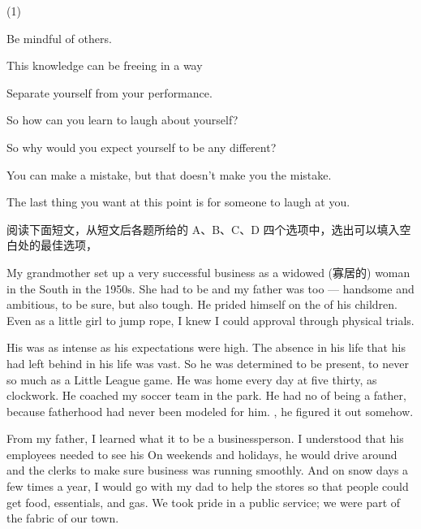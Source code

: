 \documentclass{英语试卷}
\begin{document}
\begin{choices}(1)
  \item Be mindful of others.
  \item This knowledge can be freeing in a way
  \item Separate yourself from your performance.
  \item So how can you learn to laugh about yourself?
  \item So why would you expect yourself to be any different?
  \item You can make a mistake, but that doesn't make you the mistake.
  \item The last thing you want at this point is for someone to laugh at you.
\end{choices}
\par 阅读下面短文，从短文后各题所给的 A、B、C、D 四个选项中，选出可以填入空白处的最佳选项，\par
\par My grandmother set up a very successful business as a widowed (寡居的) woman in the South in the 1950s. She had to be  and my father was too — handsome and ambitious, to be sure, but also tough. He prided himself on the  of his children. Even as a little girl  to jump rope, I knew I could  approval through physical trials.\par
\par His  was as intense as his expectations were high. The absence in his life that his  had left behind in his life was vast. So he was determined to be present, to never  so much as a Little League game. He was home every day at five thirty,  as clockwork. He coached my soccer team in the park. He had no  of being a father, because fatherhood had never been modeled for him. , he figured it out somehow.\par
\par From my father, I learned what it  to be a businessperson. I understood that his employees needed to see his  On weekends and holidays, he would drive around and  the clerks to make sure business was running smoothly. And on snow days a few times a year, I would go with my dad to help  the stores so that people could get food, essentials, and gas. We took pride in  a public service; we were part of the fabric of our town.\par
\end{document}
